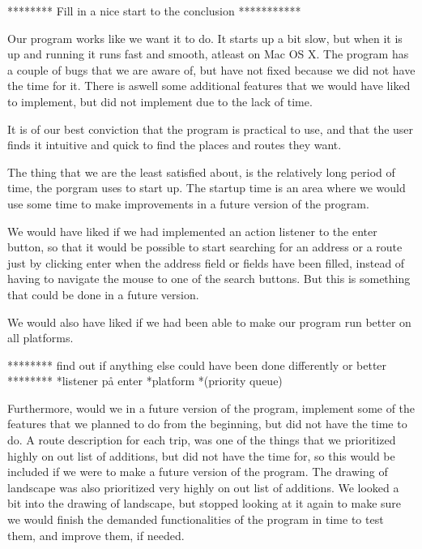 ******** Fill in a nice start to the conclusion ***********

Our program works like we want it to do. It starts up a bit slow, but when it is up and running it runs fast and smooth, atleast on Mac OS X.
The program has a couple of bugs that we are aware of, but have not fixed because we did not have the time for it. There is aswell some additional features that we would have liked to implement, but did not implement due to the lack of time. 

It is of our best conviction that the program is practical to use, and that the user finds it intuitive and quick to find the places and routes they want. 

The thing that we are the least satisfied about, is the relatively long period of time, the porgram uses to start up. The startup time is an area where we would use some time to make improvements in a future version of the program. 

We would have liked if we had implemented an action listener to the enter button, so that it would be possible to start searching for an address or a route just by clicking enter when the address field or fields have been filled, instead of having to navigate the mouse to one of the search buttons. But this is something that could be done in a future version.

We would also have liked if we had been able to make our program run better on all platforms. 


******** find out if anything else could have been done differently or better ******** 
*listener på enter
*platform
*(priority queue)


Furthermore, would we in a future version of the program, implement some of the features that we planned to do from the beginning, but did not have the time to do. A route description for each trip, was one of the things that we prioritized highly on out list of additions, but did not have the time for, so this would be included if we were to make a future version of the program. 
The drawing of landscape was also prioritized very highly on out list of additions. We looked a bit into the drawing of landscape, but stopped looking at it again to make sure we would finish the demanded functionalities of the program in time to test them, and improve them, if needed.
